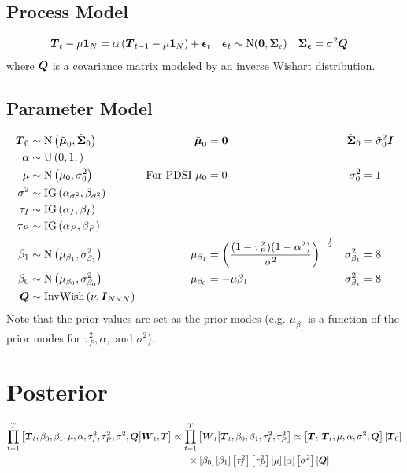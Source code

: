 \documentclass{article}\usepackage[]{graphicx}\usepackage[]{color}
\def\bm#1{\mbox{\boldmath $#1$}}
\begin{document}
\subsection{Process Model}
%
\begin{align*}
\bm{T}_t - \mu \bm{1}_N & = \alpha \left( \bm{T}_{t - 1} - \mu \bm{1}_N \right) + \bm{\epsilon}_t  & \bm{\epsilon}_t & \sim \mbox{N}(\bm{0}, \bm{\Sigma}_\epsilon) & \bm{\Sigma_\epsilon} & = \sigma^2 \bm{Q}
\end{align*}
%
where $\bm{Q}$ is a covariance matrix modeled by an inverse Wishart distribution.
%
%
\subsection{Parameter Model}
%
\begin{align*}
%
\bm{T}_0 & \sim \mbox{N}\left( \tilde{\bm{\mu}}_0, \tilde{\bm{\Sigma}}_0 \right) & \tilde{\bm{\mu}}_0 & = \bm{0} & \tilde{\bm{\Sigma}}_0 & = \tilde{\sigma}^2_0 \bm{I}\\
%
\alpha & \sim \mbox{U}\left( 0, 1, \right)\\
%
\mu & \sim \mbox{N} \left( \mu_0, \sigma^2_0 \right) & \mbox{For PDSI } \mu_0 & = 0 & \sigma^2_0 & = 1 \\
%
\sigma^2 & \sim \mbox{IG}\left( \alpha_{\sigma^2}, \beta_{\sigma^2} \right)\\
%
\tau_I & \sim \mbox{IG}\left( \alpha_I, \beta_I \right)\\
%
\tau_P & \sim \mbox{IG}\left( \alpha_P, \beta_P \right)\\
%
\beta_1 & \sim \mbox{N} \left( \mu_{\beta_1}, \sigma^2_{\beta_1} \right) & \mu_{\beta_1} & = \left( \frac{(1 - \tau_P^2) (1 - \alpha^2)} {\sigma^2} \right)^{ - \frac{1} {2} } & \sigma^2_{\beta_1} & = 8 \\
%
\beta_0 & \sim \mbox{N} \left( \mu_{\beta_0}, \sigma^2_{\beta_0} \right) & \mu_{\beta_0} & = - \mu \beta_1 & \sigma^2_{\beta_1} & = 8 \\
%
\bm{Q} & \sim \mbox{InvWish}\left( \nu, \bm{I}_{N \times N} \right)\\
%
\end{align*}
%
Note that the prior values are set as the prior modes (e.g. $\mu_{\beta_1}$ is a function of the prior modes for $\tau^2_P, \alpha, \mbox{ and } \sigma^2$).
%
%
\section{Posterior}
%
\begin{align*}
%
\prod_{t = 1}^T \left[ \bm{T}_t, \beta_0, \beta_1, \mu, \alpha, \tau^2_I, \tau^2_P, \sigma^2, \bm{Q} \middle| \bm{W}_t, T \right] & \propto \prod_{t = 1}^T \left[ \bm{W}_t \middle| \bm{T}_t, \beta_0, \beta_1, \tau^2_I, \tau^2_P \right] \propto \left[ \bm{T}_t \middle| \bm{T}_t, \mu, \alpha, \sigma^2, \bm{Q} \right] \left[ \bm{T}_0 \right] \\ 
& \hspace{6mm} \times \left[ \beta_0 \right] \left[ \beta_1 \right] \left[ \tau^2_I \right] \left[ \tau^2_P \right] \left[ \mu \right] \left[ \alpha \right] \left[ \sigma^2 \right] \left[ \bm{Q} \right] 
%
\end{align*}
%
%
\end{document}

